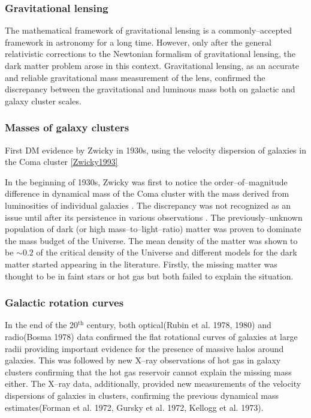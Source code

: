 \documentclass[paper=a4, fontsize=11pt]{scrartcl} %
\numberwithin{equation}{section} %
\numberwithin{figure}{section} %
\numberwithin{table}{section} %
\newcommand{\ignore}[1]{}
\begin{document}
\subsubsection{Gravitational lensing}

The mathematical framework of gravitational lensing is a commonly--accepted framework in astronomy for a long time. However, only after the general relativistic corrections to the Newtonian formalism of gravitational lensing, the dark matter problem arose in this context. Gravitational lensing, as an accurate and reliable gravitational mass measurement of the lens, confirmed the discrepancy between the gravitational and luminous mass both on galactic and galaxy cluster scales.

\subsubsection{Masses of galaxy clusters}

First DM evidence by Zwicky in 1930s, using the velocity dispersion of galaxies in the Coma cluster \ref{Zwicky1993}

In the beginning of 1930s, Zwicky was first to notice the order--of--magnitude difference in dynamical mass of the Coma cluster with the mass derived from luminosities of individual galaxies \citep[][]{Zwicky1993}. The discrepancy was not recognized as an issue until after its persistence in various observations \citep[e.g. Vera Rubin in 1970s][]{Einasto+1974, Ostriker+1974}. The previously--unknown population of dark (or high mass--to--light--ratio) matter was proven to dominate the mass budget of the Universe. The mean density of the matter was shown to be $\sim 0.2$ of the critical density of the Universe and different models for the dark matter started appearing in the literature. Firstly, the missing matter was thought to be in faint stars or hot gas but both failed to explain the situation\ignore{cite and explain why! or maybe not as it's not really important now!!}.

\subsubsection{Galactic rotation curves}
 
In the end of the 20$^\mathrm{th}$ century, both optical(Rubin et al. 1978, 1980) and radio(Bosma 1978) data confirmed the flat rotational curves of galaxies at large radii providing important evidence for the presence of massive halos around galaxies. This was followed by new X--ray observations of hot gas in galaxy clusters confirming that the hot gas reservoir cannot explain the missing mass either. The X--ray data, additionally, provided new measurements of the velocity dispersions of galaxies in clusters, confirming the previous dynamical mass estimates(Forman et al. 1972, Gursky et al. 1972, Kellogg et al. 1973). 
\end{document}
